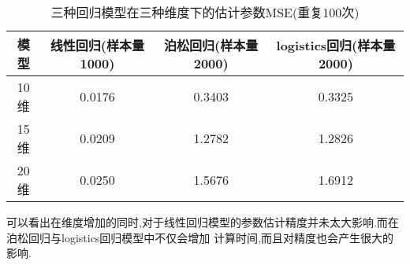 \begin{table}[htbp]
    \centering
    \caption{三种回归模型在三种维度下的估计参数MSE(重复100次)}
    \label{tab:compare_mse}
    \begin{tabular}{c|c|c|c}
    \hline
    模型  & 线性回归(样本量1000) & 泊松回归(样本量2000) & logistics回归(样本量2000) \\ \hline
    10维 & 0.0176        & 0.3403        & 0.3325               \\ \hline
    15维 & 0.0209        & 1.2782        & 1.2826               \\ \hline
    20维 & 0.0250        & 1.5676        & 1.6912               \\ \hline
    \end{tabular}
    \end{table}


可以看出在维度增加的同时,对于线性回归模型的参数估计精度并未太大影响.而在泊松回归与logistics回归模型中不仅会增加
计算时间,而且对精度也会产生很大的影响.